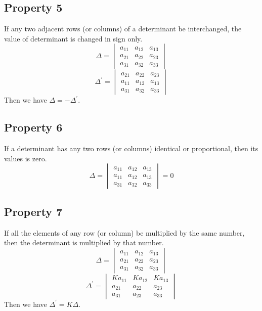 \documentclass{article}
\begin{document}
\subsection*{Property 5}
If any two adjacent rows (or columns) of a
determinant be interchanged, the value of
determinant is changed in sign only.
\begin{equation*}
    \Delta=
    \begin{vmatrix}
        a_{11} & a_{12} & a_{13} \\
        a_{21} & a_{22} & a_{23} \\
        a_{31} & a_{32} & a_{33} 
    \end{vmatrix}
\end{equation*}
\begin{equation*}
    \Delta^{'}=
    \begin{vmatrix}
        a_{21} & a_{22} & a_{23} \\
        a_{11} & a_{12} & a_{13} \\
        a_{31} & a_{32} & a_{33} 
    \end{vmatrix}
\end{equation*}
Then we have $\Delta=-\Delta^{'}$.

\subsection*{Property 6}
If a determinant has any two rows (or columns) identical or proportional, then its values is zero.
\begin{equation*}
    \Delta=
    \begin{vmatrix}
        a_{11} & a_{12} & a_{13} \\
        a_{11} & a_{12} & a_{13} \\
        a_{31} & a_{32} & a_{33} 
    \end{vmatrix}
    =0
\end{equation*}
\subsection*{Property 7}
If all the elements of any row (or column) be
multiplied by the same number, then the determinant
is multiplied by that number.
\begin{equation*}
    \Delta=
    \begin{vmatrix}
        a_{11} & a_{12} & a_{13} \\
        a_{21} & a_{22} & a_{23} \\
        a_{31} & a_{32} & a_{33} 
    \end{vmatrix}
\end{equation*}
\begin{equation*}
    \Delta^{'}=
    \begin{vmatrix}
        Ka_{11} & Ka_{12} & Ka_{13} \\
        a_{21} & a_{22} & a_{23} \\
        a_{31} & a_{23} & a_{33} 
    \end{vmatrix}
\end{equation*}
Then we have $\Delta^{'}=K\Delta$.
\end{document}
